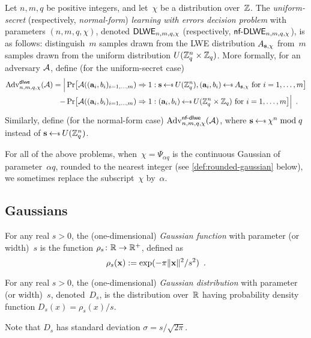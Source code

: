 \documentclass{iacrcc}
\begin{document}
\begin{definition}
  \label{def:dlweproblem}
  Let $n, m, q$ be positive integers, and let~$\chi$ be a distribution
  over~$\mathbb{Z}$.  The \emph{uniform-secret} (respectively,
  \emph{normal-form}) \emph{learning with errors decision problem}
  with parameters $(n, m, q, \chi)$, denoted $\textsf{\upshape\mdseries DLWE}_{n,m,q,\chi}$ 
  (respectively, $\textsf{\upshape\mdseries nf-DLWE}_{n,m,q,\chi}$), is as follows: distinguish~$m$
  samples drawn from the LWE distribution $A_{\mathbf{s}, \chi}$ from~$m$
  samples drawn from the uniform distribution
  $U(\mathbb{Z}_q^n \times \mathbb{Z}_q)$.  More formally, for an adversary
  $\mathcal{A}$, define (for the uniform-secret case)
  \begin{align*}
    \Adv{\dlwe}{n,m,q,\chi}(\Adversary) = \Big|
      &\Pr \bracks*{
      \Adversary((\bfa_{i}, b_{i})_{i=1,\ldots,m}) \Rightarrow 1 :
      \bfs \getsr U(\bbZ_q^n), (\bfa_{i}, b_{i}) \getsr
      A_{\bfs,\chi} \text{ for } i=1,\ldots, m } \\
    - &\Pr \bracks*{
      \Adversary((\bfa_{i}, b_{i})_{i=1,\ldots,m}) \Rightarrow 1 :
      (\bfa_{i}, b_{i}) \getsr U(\bbZ_{q}^{n} \times \bbZ_{q})
      \text{ for } i=1,\ldots, m } \Big| \enspace .
  \end{align*}
  Similarly, define (for the normal-form case)
  $\mathrm{Adv}^{\textsf{\upshape\mdseries \textsf{\upshape\mdseries nf-dlwe}}}_{n,m,q,\chi}(\mathcal{A})$,  where
  $\bfs \getsr \chi^{n} \bmod q$ instead of
  $\bfs \getsr U(\bbZ_{q}^{n})$.
\end{definition}

For all of the above problems, when~$\chi = \Psi_{\alpha q}$ is the
continuous Gaussian of parameter~$\alpha q$, rounded to the nearest
integer (see \autoref{def:rounded-gaussian} below), we sometimes
replace the subscript~$\chi$ by~$\alpha$.

\subsection{Gaussians}
\label{sec:gaussians}

For any real $s > 0$, the (one-dimensional) \emph{Gaussian function}
with parameter (or width)~$s$ is the function
$\rho_{s} \colon \mathbb{R} \to \mathbb{R}^{+}$, defined as
\[ \rho_s(\mathbf{x}) := \exp(-\pi \lVert\mathbf{x}\rVert^2/s^2) \enspace .\]

\begin{definition}
  \label{def:gaussian}
  For any real $s > 0$, the (one-dimensional) \emph{Gaussian
    distribution} with parameter (or width)~$s$, denoted~$D_{s}$, is
  the distribution over~$\mathbb{R}$ having probability density function
  $D_{s}(x) = \rho_{s}(x)/s$.
\end{definition}
Note that $D_{s}$ has standard deviation $\sigma = s / \sqrt{2 \pi}$.
\end{document}
